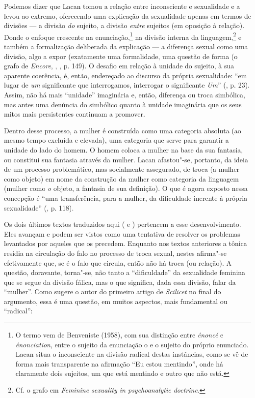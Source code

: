 Podemos dizer que Lacan tomou a relação entre inconsciente e sexualidade
e a levou ao extremo, oferecendo uma explicação da sexualidade apenas em
termos de divisões --- a divisão \emph{do} sujeito, a divisão
\emph{entre} sujeitos (em oposição à relação). Donde o enfoque crescente
na enunciação,\footnote{O termo vem de Benveniste (1958), com
  sua distinção entre \emph{énoncé} e \emph{énonciation}, entre o
  sujeito da enunciação o e o sujeito do próprio enunciado. Lacan situa
  o inconsciente na divisão radical destas instâncias, como se vê de
  forma mais transparente na afirmação ``Eu estou mentindo'', onde há
  claramente dois sujeitos, um que está mentindo e outro que não está.}
na divisão interna da linguagem,\footnote{Cf. o grafo em \emph{Feminine
  sexuality in psychoanalytic doctrine}.} e também a formalização
deliberada da explicação --- a diferença sexual como uma divisão, algo a
expor (exatamente uma formalidade, uma questão de forma (o grafo de
\emph{Encore}, , , p. 149). O desafio em relação à unidade
do sujeito, à sua aparente coerência, é, então, endereçado ao discurso
da própria sexualidade: ``em lugar de \emph{um} significante que
interrogamos, interrogar o significante \emph{Um}'' (, p. 23). Assim,
não há mais ``unidade'' imaginária e, então, diferença ou troca
simbólica, mas antes uma denúncia do simbólico quanto à unidade
imaginária que os seus mitos mais persistentes continuam a promover.

Dentro desse processo, a mulher é construída como uma categoria absoluta
(ao mesmo tempo excluída e elevada), uma categoria que serve para
garantir a unidade do lado do homem. O homem coloca a mulher na base da
sua fantasia, ou constitui sua fantasia através da mulher. Lacan
afastou"-se, portanto, da ideia de um processo problemático, mas
socialmente assegurado, de troca (a mulher como objeto) em nome da
construção da mulher como categoria da linguagem (mulher como \emph{o}
objeto, a fantasia de sua definição). O que é agora exposto nessa
concepção é ``uma transferência, para a mulher, da dificuldade inerente
à própria sexualidade'' (, p. 118).

Os dois últimos textos traduzidos aqui ( e ) pertencem a esse
desenvolvimento. Eles avançam e podem ser vistos como uma tentativa de
resolver os problemas levantados por aqueles que os precedem. Enquanto
nos textos anteriores a tônica residia na circulação do falo no processo
de troca sexual, nestes afirma"-se efetivamente que, se é o falo que
circula, então não há troca (ou relação). A questão, doravante,
torna"-se, não tanto a ``dificuldade'' da sexualidade feminina que se
segue da divisão fálica, mas o que significa, dada essa divisão, falar
da ``mulher''. Como sugere o autor do primeiro artigo de \emph{Scilicet}
no final do argumento, essa é uma questão, em muitos aspectos, mais
fundamental ou ``radical'':

